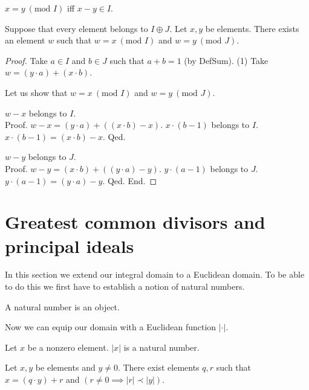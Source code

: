\documentclass{article}
\renewcommand{\mod}{\text{mod }}
\begin{document}
  \begin{forthel}
    \begin{definition}[DefMod]
      $x = y ~(\mod I)$ iff $x - y \in I$.
    \end{definition}

    \begin{theorem}[ChineseRemainder]
      Suppose that every element belongs to $I \oplus J$.
      Let $x, y$ be elements.
      There exists an element $w$ such that $w = x ~(\mod I)$ and
      $w = y ~(\mod J)$.
    \end{theorem}
    \begin{proof}
      Take $a \in I$ and $b \in J$ such that $a + b = 1$ (by DefSum).
      (1) Take $w = (y \cdot a) + (x \cdot b)$.

      Let us show that $w = x ~(\mod I)$ and $w = y ~(\mod J)$.

        $w - x$ belongs to $I$. \\
        Proof.
          $w - x = (y \cdot a) + ((x \cdot b) - x)$.
          $x \cdot (b - 1)$ belongs to $I$.
          $x \cdot (b - 1) = (x \cdot b) - x$.
        Qed.

        $w - y$ belongs to $J$. \\
        Proof.
          $w - y = (x \cdot b) + ((y \cdot a) - y)$.
          $y \cdot (a - 1)$ belongs to $J$.
          $y \cdot (a - 1) = (y \cdot a) - y$.
        Qed.
      End.
    \end{proof}
  \end{forthel}


  \section{Greatest common divisors and principal ideals}

  In this section we extend our integral domain to a Euclidean domain. To be
  able to do this we first have to establish a notion of natural numbers.

  \begin{forthel}

    \begin{signature}[NatSort]
      A natural number is an object.
    \end{signature}

  \end{forthel}

  Now we can equip our domain with a Euclidean function $|\cdot|$.

  \begin{forthel}
    \begin{signature}[EucSort]
      Let $x$ be a nonzero element. $|x|$ is a natural number.
    \end{signature}

    \begin{axiom}[Division]
      Let $x,y$ be elements and $y \neq 0$.
      There exist elements $q,r$ such that $x = (q \cdot y) + r$ and
      $(r \neq 0 \implies |r| \prec |y|)$.
    \end{axiom}
  \end{forthel}
\end{document}
